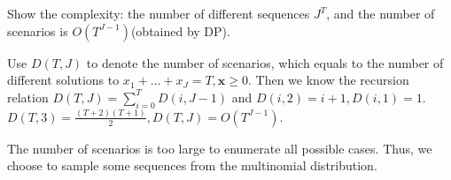 










Show the complexity: the number of different sequences $J^{T}$, and the number of scenarios is $O(T^{J-1})$(obtained by DP).

Use $D(T,J) $ to denote the number of scenarios, which equals to the number of different solutions to $x_{1}+\ldots + x_{J} = T, \mathbf{x} \geq 0$.
Then we know the recursion relation $D(T, J) = \sum_{i= 0}^{T} D(i, J-1)$ and $D(i,2) = i+1, D(i,1) = 1$.
$D(T,3) = \frac{(T+2)(T+1)}{2}, D(T,J) = O(T^{J-1})$.

The number of scenarios is too large to enumerate all possible cases.
Thus, we choose to sample some sequences from the multinomial distribution.

